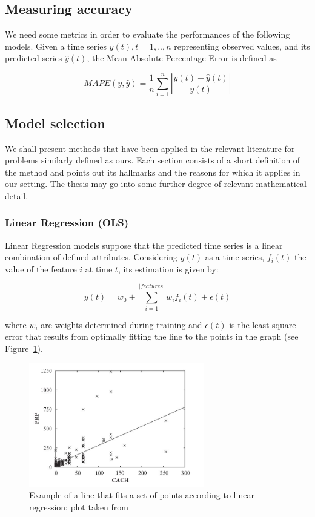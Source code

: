 \documentclass{article}
\begin{document}
\subsection{Measuring accuracy}
We need some metrics in order to evaluate the performances of the following models. Given a time series 
$y(t), t=1,..,n$ representing observed values, and its predicted series $\hat{y}(t)$, the Mean Absolute Percentage Error is defined as \cite{Chen}\cite{Rajabioun}

$$MAPE(y, \hat{y}) = \frac{1}{n}\sum_{i=1}^{n}|\frac{y(t) - \hat{y}(t)}{y(t)}|$$

\subsection{Model selection}
We shall present methods that have been applied in the relevant literature for problems similarly defined as ours. Each section consists of a short definition of the method and points out its hallmarks and the reasons for which it applies in our setting. The thesis may go into some further degree of relevant mathematical detail.

\subsubsection{Linear Regression (OLS)}
Linear Regression models suppose that the predicted time series is a linear combination of defined attributes. Considering $y(t)$ as a time series, $f_i(t)$ the value of the feature $i$ at time $t$, its estimation is given by:

$$y(t) = w_0 + \sum_{i=1}^{|features|}w_i f_i(t) + \epsilon(t)$$

where $w_i$ are weights determined during training and $\epsilon(t)$ is the least square error that results from optimally fitting the line to the points in the graph (see Figure~\ref{fig:linear-regression}).

\begin{figure}[!ht]
    \centering
    \includegraphics[width=3.0in]{linear-regression}
    \caption{Example of a line that fits a set of points according to linear regression; plot taken from \cite{Witten} }
    \label{fig:linear-regression}
\end{figure}
\end{document}
